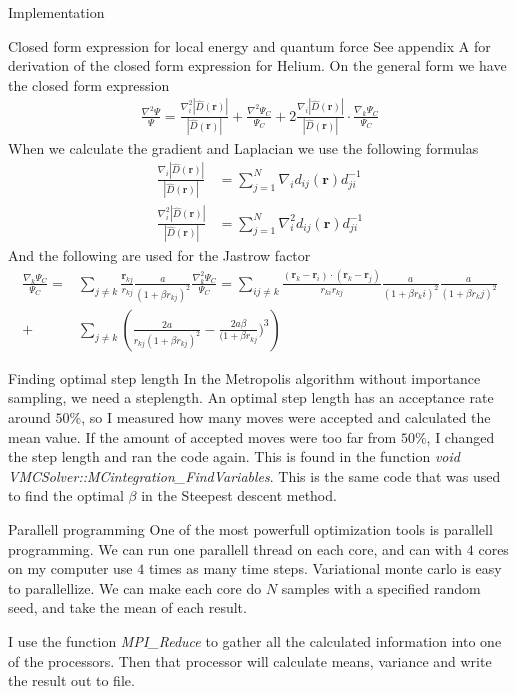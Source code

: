 \documentclass[a4paper, 12pt, titlepage]{article}
\begin{document}
\begin{section}{Implementation}
 \begin{subsection}{Closed form expression for local energy and quantum force}
 	See appendix A for derivation of the closed form expression for Helium. On the general form we have the closed form expression
 	\begin{align}
 		\frac{\nabla^2 \Psi}{\Psi} = \frac{\nabla^2_i|\hat D(\mathbf{r})|}{|\hat D(\mathbf{r})|} + \frac{\nabla^2 \Psi_C}{\Psi_C} + 2 \frac{\nabla_i|\hat D(\mathbf{r})|}{|\hat D(\mathbf{r})|} \cdot \frac{\nabla_k \Psi_C}{\Psi_C}
 	\end{align}
 	When we calculate the gradient and Laplacian we use the following formulas
 	\begin{align}
 		\frac{\nabla_i|\hat D(\mathbf{r})|}{|\hat D(\mathbf{r})|} &= \sum_{j=1}^N \nabla_i d_{ij}(\mathbf{r})d_{ji}^{-1} \\
 		\frac{\nabla^2_i|\hat D(\mathbf{r})|}{|\hat D(\mathbf{r})|} &= \sum_{j=1}^N \nabla^2_i d_{ij}(\mathbf{r})d_{ji}^{-1} 
 	\end{align}
 	And the following are used for the Jastrow factor
 	\begin{align*}
 		\frac{\nabla_k \Psi_C}{\Psi_C} = &\sum_{j\neq k} \frac{\mathbf{r}_{kj}}{r_{kj}} \frac{a}{(1+\beta r_{kj})^2}
 		\frac{\nabla_k^2 \Psi_C}{\Psi_C} = \sum_{ij \neq k} \frac{(\mathbf{r}_k - \mathbf{r}_i) \cdot (\mathbf{r}_k - \mathbf{r}_j)}{r_{ki}r_{kj}} \frac{a}{(1+\beta r_ki)^2} \frac{a}{(1+\beta r_kj)^2} \\ + &\sum_{j\neq k} \left( \frac{2a}{r_{kj}(1+\beta r_{kj})^2} - \frac{2a \beta}{(1 + \beta r_{kj}})^3 \right)
 	\end{align*}
 \end{subsection}

 \begin{subsection}{Finding optimal step length}
  In the Metropolis algorithm without importance sampling, we need a steplength. An optimal step length has an acceptance rate around $50\%$, so I measured how many moves were accepted and calculated the mean value. If the amount of accepted moves were too far from $50\%$, I changed the step length and ran the code again. This is found in the function \textit{void VMCSolver::MCintegration\_FindVariables}. 
  This is the same code that was used to find the optimal $\beta$ in the Steepest descent method. 
 \end{subsection}
	
 \begin{subsection}{Parallell programming}
  One of the most powerfull optimization tools is parallell programming. We can run one parallell thread on each core, and can with $4$ cores on my computer use $4$ times as many time steps. Variational monte carlo is easy to parallellize. We can make each core do $N$ samples with a specified random seed, and take the mean of each result. \par
  I use the function \textit{MPI\_Reduce} to gather all the calculated information into one of the processors. Then that processor will calculate means, variance and write the result out to file. 
 \end{subsection}


\end{section}
\end{document}

